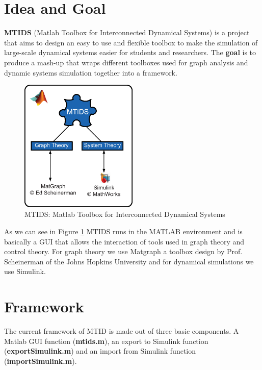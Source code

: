 \documentclass[a4paper,twoside, openright,12pt]{report}
\begin{document}
\section{Idea and Goal}

\textbf{MTIDS} (Matlab Toolbox for Interconnected Dynamical Systems) is a project that aims to design an easy 
to use and flexible toolbox to make the simulation of large-scale dynamical systems easier for students and researchers. 
The \textbf{goal} is to produce a mash-up that wraps different toolboxes used for graph analysis and 
dynamic systems simulation together into a framework.  


\begin{figure}[htb]
\centering
\includegraphics[width=0.5\textwidth]{pics/mtidsStructure.eps}
\caption[MTIDS idea]{MTIDS: Matlab Toolbox for Interconnected Dynamical Systems}
\label{mtidsFig}
\end{figure}

As we can see in Figure \ref{mtidsFig} MTIDS runs in the MATLAB environment and is basically a GUI that allows the interaction of tools used in graph theory 
and control theory.  For graph theory we use Matgraph a toolbox design by Prof. Scheinerman of the Johns Hopkins University \cite{MatgraphByExample} and for dynamical simulations
we use Simulink\cite{MatlabDocu}. 

\section{Framework}

The current framework of MTID is made out of three basic components. A Matlab GUI function (\textbf{mtids.m}), an export to Simulink function (\textbf{exportSimulink.m}) and
an import from Simulink function (\textbf{importSimulink.m}).\\
\end{document}
